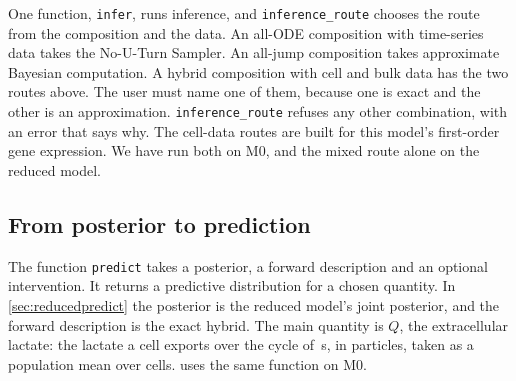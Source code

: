 One function, \texttt{infer}, runs inference, and \texttt{inference\_route} chooses
the route from the composition and the data. An all-ODE composition with
time-series data takes the No-U-Turn Sampler. An all-jump composition takes
approximate Bayesian computation. A hybrid composition with cell and bulk data has
the two routes above. The user must name one of them, because one is exact and the other is an
approximation. \texttt{inference\_route} refuses any other combination, with an error that says
why. The cell-data routes are built for this model's first-order gene expression. We have run
both on M0, and the mixed route alone on the reduced model.

\subsection{From posterior to prediction}
\label{sec:predictapi}

The function \texttt{predict} takes a posterior, a forward description and an optional
intervention. It returns a predictive distribution for a chosen quantity. In
\cref{sec:reducedpredict} the posterior is the reduced model's joint posterior, and the forward
description is the exact hybrid. The main quantity is $Q$, the extracellular lactate: the lactate a
cell exports over the cycle of \,s, in particles, taken as a population mean
over cells.  uses the same
function on M0.

